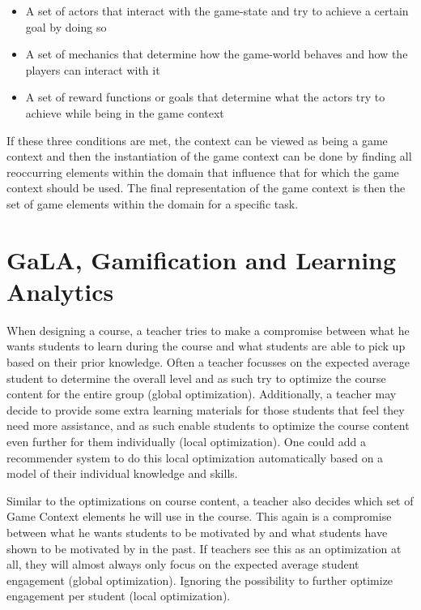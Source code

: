 \documentclass[11pt]{article}
\begin{document}
\begin{itemize}
  \item A set of actors that interact with the game-state and try to achieve a certain goal by doing so
  \item A set of mechanics that determine how the game-world behaves and how the players can interact with it
  \item A set of reward functions or goals that determine what the actors try to achieve while being in the game context
\end{itemize}

If these three conditions are met, the context can be viewed as being a game context and then the instantiation of the game context can be done by finding all reoccurring elements within the domain that influence that for which the game context should be used. The final representation of the game context is then the set of game elements within the domain for a specific task.

\section{GaLA, Gamification and Learning Analytics}\label{sec:gala}
When designing a course, a teacher tries to make a compromise between what he wants students to learn during the course and what students are able to pick up based on their prior knowledge. Often a teacher focusses on the expected average student to determine the overall level and as such try to optimize the course content for the entire group (global optimization). Additionally, a teacher may decide to provide some extra learning materials for those students that feel they need more assistance, and as such enable students to optimize the course content even further for them individually (local optimization). One could add a recommender system to do this local optimization automatically based on a model of their individual knowledge and skills.

Similar to the optimizations on course content, a teacher also decides which set of Game Context elements he will use in the course. This again is a compromise between what he wants students to be motivated by and what students have shown to be motivated by in the past. If teachers see this as an optimization at all, they will almost always only focus on the expected average student engagement (global optimization). Ignoring the possibility to further optimize engagement per student (local optimization).
\end{document}
